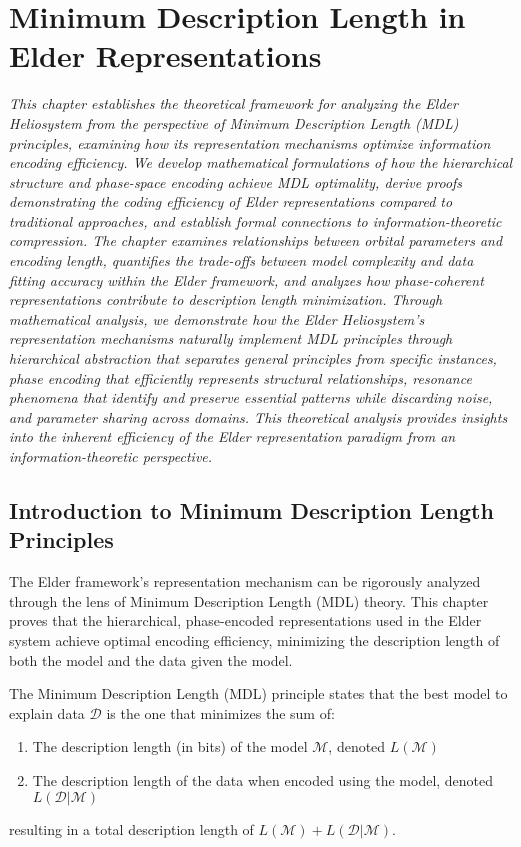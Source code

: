 \chapter{Minimum Description Length in Elder Representations}

\textit{This chapter establishes the theoretical framework for analyzing the Elder Heliosystem from the perspective of Minimum Description Length (MDL) principles, examining how its representation mechanisms optimize information encoding efficiency. We develop mathematical formulations of how the hierarchical structure and phase-space encoding achieve MDL optimality, derive proofs demonstrating the coding efficiency of Elder representations compared to traditional approaches, and establish formal connections to information-theoretic compression. The chapter examines relationships between orbital parameters and encoding length, quantifies the trade-offs between model complexity and data fitting accuracy within the Elder framework, and analyzes how phase-coherent representations contribute to description length minimization. Through mathematical analysis, we demonstrate how the Elder Heliosystem's representation mechanisms naturally implement MDL principles through hierarchical abstraction that separates general principles from specific instances, phase encoding that efficiently represents structural relationships, resonance phenomena that identify and preserve essential patterns while discarding noise, and parameter sharing across domains. This theoretical analysis provides insights into the inherent efficiency of the Elder representation paradigm from an information-theoretic perspective.}

\section{Introduction to Minimum Description Length Principles}

The Elder framework's representation mechanism can be rigorously analyzed through the lens of Minimum Description Length (MDL) theory. This chapter proves that the hierarchical, phase-encoded representations used in the Elder system achieve optimal encoding efficiency, minimizing the description length of both the model and the data given the model.

\begin{definition}
The Minimum Description Length (MDL) principle states that the best model to explain data $\mathcal{D}$ is the one that minimizes the sum of:
\begin{enumerate}
    \item The description length (in bits) of the model $\mathcal{M}$, denoted $L(\mathcal{M})$
    \item The description length of the data when encoded using the model, denoted $L(\mathcal{D} | \mathcal{M})$
\end{enumerate}
resulting in a total description length of $L(\mathcal{M}) + L(\mathcal{D} | \mathcal{M})$.
\end{definition}

